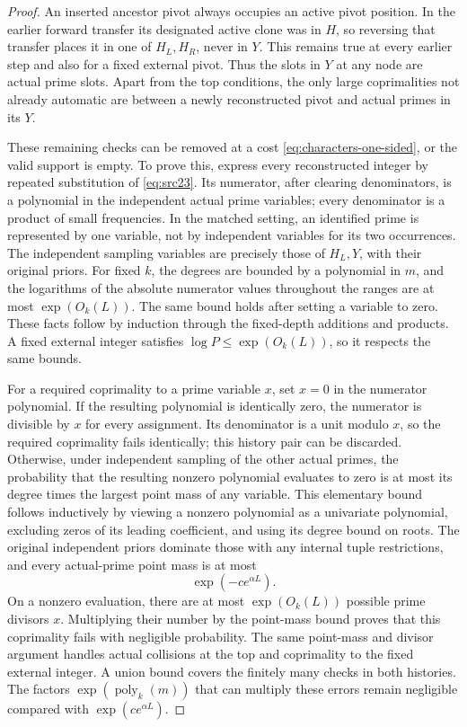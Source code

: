 \begin{proof}
An inserted ancestor pivot always occupies an active pivot
position. In the earlier forward transfer its designated
active clone was in \(H\), so reversing that transfer places
it in one of \(H_L,H_R\), never in \(Y\). This remains true
at every earlier step and also for a fixed external pivot.
Thus the slots in \(Y\) at any node are actual prime slots.
Apart from the top conditions, the only large coprimalities
not already automatic are between a newly reconstructed
pivot and actual primes in its \(Y\).

These remaining checks can be removed at a cost
\eqref{eq:characters-one-sided}, or the valid support is
empty. To prove this, express every reconstructed integer
by repeated substitution of \eqref{eq:src23}. Its numerator,
after clearing denominators, is a polynomial in the independent
actual prime variables; every denominator is a product of
small frequencies. In the matched setting, an identified
prime is represented by one variable, not by independent
variables for its two occurrences. The independent sampling
variables are precisely those of \(H_L,Y\), with their original
priors. For fixed \(k\), the degrees are bounded by a
polynomial in \(m\), and the logarithms of the absolute
numerator values throughout the ranges are at most
\(\exp(O_k(L))\). The same bound holds after setting a
variable to zero. These facts follow by induction through
the fixed-depth additions and products. A fixed external
integer satisfies \(\log P\le\exp(O_k(L))\), so it respects
the same bounds.

For a required coprimality to a prime variable \(x\), set
\(x=0\) in the numerator polynomial. If the resulting
polynomial is identically zero, the numerator is divisible
by \(x\) for every assignment. Its denominator is a unit
modulo \(x\), so the required coprimality fails identically;
this history pair can be discarded. Otherwise, under
independent sampling of the other actual primes, the
probability that the resulting nonzero polynomial evaluates
to zero is at most its degree times the largest point
mass of any variable. This elementary bound follows
inductively by viewing a nonzero polynomial as a univariate
polynomial, excluding zeros of its leading coefficient,
and using its degree bound on roots. The original independent
priors dominate those with any internal tuple restrictions,
and every actual-prime point mass is at most
\[
 \exp(-c e^{\alpha L}).
\]
On a nonzero evaluation, there are at most
\(\exp(O_k(L))\) possible prime divisors \(x\).
Multiplying their number by the point-mass bound proves
that this coprimality fails with negligible probability.
The same point-mass and divisor argument handles actual
collisions at the top and coprimality to the fixed external
integer. A union bound covers the finitely many checks in
both histories. The factors \(\exp(\operatorname{poly}_k(m))\)
that can multiply these errors remain negligible compared
with \(\exp(c e^{\alpha L})\).


\end{proof}
